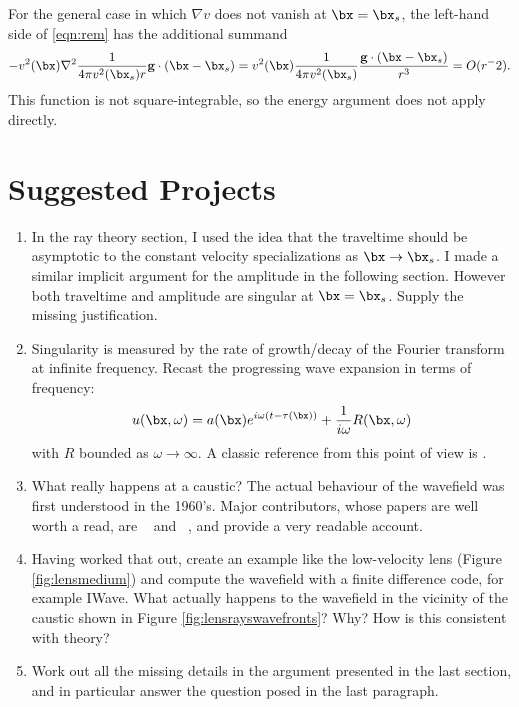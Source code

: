 For the general case in which $\nabla v$ does not vanish at
$\bx=\bx_s$, the left-hand side of \ref{eqn:rem} has the additional summand
\begin{equation}
\label{eqn:term2}
-v^2(\bx)\nabla^2\frac{1}{4\pi v^2(\bx_s) r} {\bf g}\cdot (\bx-\bx_s) 
= v^2(\bx)\frac{1}{4\pi v^2(\bx_s)}\frac{{\bf g}\cdot(\bx-\bx_s)}{r^3} = O(r^-2).
\end{equation}
This function is not square-integrable, so the energy argument does
not apply directly. 

\section{Suggested Projects}

\begin{enumerate}
\item In the ray theory section, I used the idea that the traveltime
 should be asymptotic to the constant velocity
  specializations as $\bx \rightarrow \bx_s$. I made a similar
  implicit argument for the amplitude in the following
  section. However both traveltime and amplitude are singular at
  $\bx=\bx_s$. Supply the missing justification.

\item Singularity is measured by the rate of growth/decay of the
  Fourier transform at infinite frequency. Recast the progressing wave
  expansion in terms of frequency:
\[
u(\bx,\omega) = a(\bx)e^{i\omega (t-\tau(\bx))}  +
\frac{1}{i\omega}R(\bx,\omega)
\] 
with $R$ bounded as $\omega \rightarrow \infty$. A classic reference
from this point of view is \cite{Lax:57}.

\item What really happens at a caustic? The actual behaviour of the
  wavefield was first understood in the 1960's. Major contributors,
  whose papers are well worth a read, are ~\cite{Lud:66} and
~\cite{Krav:68}, and \cite{StickAhl:81} provide a very readable
account.

\item Having worked that out, create an example like the low-velocity
  lens (Figure \ref{fig:lensmedium}) and compute the wavefield with a
  finite difference code, for example IWave. What actually happens to
  the wavefield in the vicinity of the caustic shown in Figure
  \ref{fig:lensrayswavefronts}? Why? How is this consistent with
  theory?

\item Work out all the missing details in the argument presented in
  the last section, and in particular answer the question posed in the
  last paragraph.
\end{enumerate}




